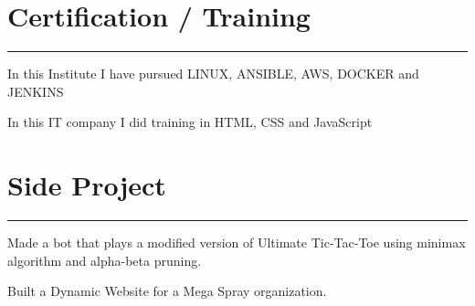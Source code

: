 \documentclass[]{rahulworld-resume}
\begin{document}
\begin{minipage}[t]{0.62\textwidth}
\section{Certification / Training} 
\noindent\rule{12.5cm}{0.4pt}
 
\noindent
\hspace{5em}%

 
\descript{}
\noindent
\hspace{2em}%
\begin{minipage}{0.95\textwidth\vspace{2pt}}
In this Institute I have pursued LINUX, ANSIBLE, AWS, DOCKER and JENKINS
\end{minipage}
 
\descript{}
\noindent
\hspace{2em}%
\begin{minipage}{0.95\textwidth\vspace{2pt}}
In this IT company I did training in HTML, CSS and JavaScript
\end{minipage}
\section{Side Project}
\noindent\rule{12.5cm}{0.4pt}
 
\noindent
\hspace{2em}%
\begin{minipage}{0.95\textwidth\vspace{5pt}}
Made a bot that plays a modified version of Ultimate Tic-Tac-Toe using
minimax algorithm and alpha-beta pruning.
\end{minipage}
 
\noindent
\hspace{2em}%
\begin{minipage}{0.95\textwidth\vspace{5pt}}
Built a Dynamic Website for a Mega Spray organization.
\end{minipage}

\end{minipage}
\end{document}
